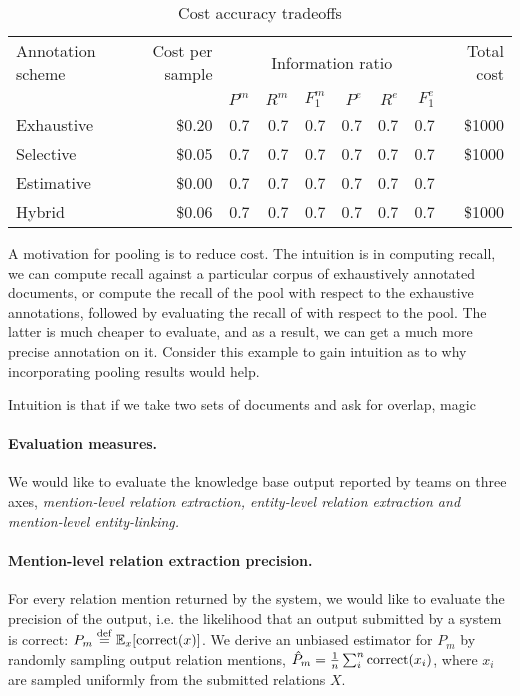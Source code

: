 \twocolumn



\begin{table*}
  \begin{tabular}{l r r r r r r r r} \toprule
    Annotation scheme & Cost per sample & \multicolumn{6}{c}{Information ratio} & Total cost \\ 
                      &                      & $P^m$ & $R^m$ & $F_1^m$ & $P^e$ & $R^e$ & $F_1^e$ &  \\ \midrule
    Exhaustive & \$0.20 & 0.7 & 0.7 & 0.7 & 0.7 & 0.7 & 0.7 & \$1000 \\
    Selective  & \$0.05 & 0.7 & 0.7 & 0.7 & 0.7 & 0.7 & 0.7 & \$1000 \\
    Estimative & \$0.00 & 0.7 & 0.7 & 0.7 & 0.7 & 0.7 & 0.7 &  \\
    Hybrid     & \$0.06 & 0.7 & 0.7 & 0.7 & 0.7 & 0.7 & 0.7 & \$1000 \\ \bottomrule
  \end{tabular}
  \caption{Cost accuracy tradeoffs}
\end{table*}

A motivation for pooling is to reduce cost.
The intuition is in computing recall, we can compute recall against a particular corpus of exhaustively annotated documents,
or compute the recall of the pool with respect to the exhaustive annotations, followed by evaluating the recall of with respect to the pool. 
The latter is much cheaper to evaluate, and as a result, we can get a much more precise annotation on it.
Consider this example to gain intuition as to why incorporating pooling results would help.

Intuition is that if we take two sets of documents and ask for overlap, magic 

\paragraph{Evaluation measures.} 
We would like to evaluate the knowledge base output reported by teams on three axes, \it{mention-level relation extraction}, \it{entity-level relation extraction} and \it{mention-level entity-linking}.

\paragraph{Mention-level relation extraction precision.}
For every relation mention returned by the system, we would like to evaluate the precision of the output, i.e. the likelihood that an output submitted by a system is correct: $P_m \stackrel{\rm def}{=} \mathbb{E}_{x}[\operatorname{correct}(x)]$.
We derive an unbiased estimator for $P_m$ by randomly sampling output relation mentions, $\hat{P}_m = \frac{1}{n} \sum_{i}^n \operatorname{correct}(x_i)$, where $x_i$ are sampled uniformly from the submitted relations $X$.

